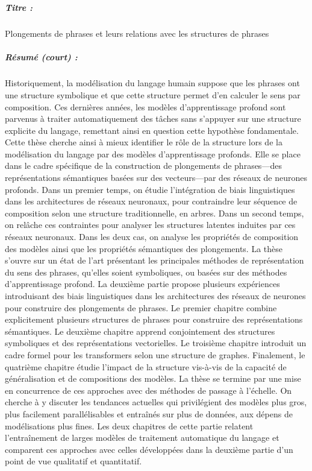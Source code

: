 \chapter*{}

\paragraph{Titre :} Plongements de phrases et leurs relations avec les structures de phrases

\paragraph{Résumé (court) :} Historiquement, la modélisation du langage humain suppose que les phrases ont une structure symbolique et que cette structure permet d’en calculer le sens par composition. Ces dernières années, les modèles d’apprentissage profond sont parvenus à traiter automatiquement des tâches sans s’appuyer sur une structure explicite du langage, remettant ainsi en question cette hypothèse fondamentale. Cette thèse cherche ainsi à mieux identifier le rôle de la structure lors de la modélisation du langage par des modèles d’apprentissage profonds. Elle se place dans le cadre spécifique de la construction de plongements de phrases—des représentations sémantiques basées sur des vecteurs—par des réseaux de neurones profonds. Dans un premier temps, on étudie l’intégration de biais linguistiques dans les architectures de réseaux neuronaux, pour contraindre leur séquence de composition selon une structure traditionnelle, en arbres. Dans un second temps, on relâche ces contraintes pour analyser les structures latentes induites par ces réseaux neuronaux. Dans les deux cas, on analyse les propriétés de composition des modèles ainsi que les propriétés sémantiques des plongements. La thèse s’ouvre sur un état de l’art présentant les principales méthodes de représentation du sens des phrases, qu’elles soient symboliques, ou basées sur des méthodes d’apprentissage profond. La deuxième partie propose plusieurs expériences introduisant des biais linguistiques dans les architectures des réseaux de neurones pour construire des plongements de phrases. Le premier chapitre combine explicitement plusieurs structures de phrases pour construire des représentations sémantiques. Le deuxième chapitre apprend conjointement des structures symboliques et des représentations vectorielles. Le troisième chapitre introduit un cadre formel pour les transformers selon une structure de graphes. Finalement, le quatrième chapitre étudie l’impact de la structure vis-à-vis de la capacité de généralisation et de compositions des modèles. La thèse se termine par une mise en concurrence de ces approches avec des méthodes de passage à l’échelle. On cherche à y discuter les tendances actuelles qui privilégient des modèles plus gros, plus facilement parallélisables et entraînés sur plus de données, aux dépens de modélisations plus fines. Les deux chapitres de cette partie relatent l'entraînement de larges modèles de traitement automatique du langage et comparent ces approches avec celles développées dans la deuxième partie d’un point de vue qualitatif et quantitatif.

